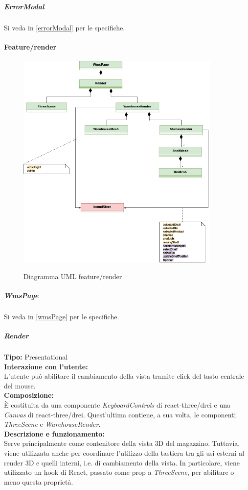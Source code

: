 \subparagraph{\colorbox{verde_uml}{ErrorModal}}
Si veda in \ref{errorModal} per le specifiche.


\paragraph{Feature/render}
\begin{figure}[H]
    \centering
    \includegraphics[width=0.9\textwidth]{images/UML/feature_render.drawio.png}
    \label{fig:UML_feature_render}
    \caption{Diagramma UML feature/render}
\end{figure}

\subparagraph{\colorbox{verde_uml}{WmsPage}}
Si veda in \ref{wmsPage} per le specifiche.

\subparagraph{\colorbox{verde_uml}{Render}}
\textbf{Tipo:} Presentational \\
\textbf{Interazione con l'utente:} \\
L'utente può abilitare il cambiamento della vista tramite click del tasto centrale del mouse. \\
\textbf{Composizione:} \\
È costituita da una componente \textit{KeyboardControls} di react-three/drei e una \textit{Canvas} di react-three/drei. Quest'ultima contiene, a sua volta, le componenti \textit{ThreeScene} e \textit{WarehouseRender}.\\
\textbf{Descrizione e funzionamento:} \\
Serve principalmente come contenitore della vista 3D del magazzino. Tuttavia, viene utilizzata anche per coordinare l'utilizzo della tastiera tra gli usi esterni al render 3D e quelli interni, i.e. di cambiamento della vista. In particolare, viene utilizzato un hook di React, passato come prop a \textit{ThreeScene}, per abilitare o meno questa proprietà. \\

